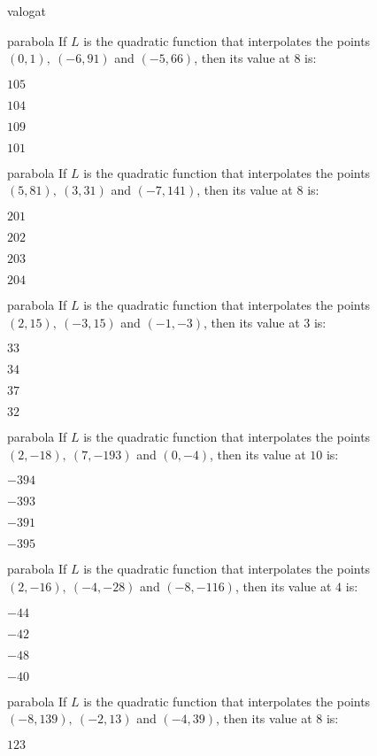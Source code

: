 \documentclass[12pt]{article}
\begin{document}
\begin{quiz}{valogat}
\begin{multi}{parabola}
If $L$ is the quadratic function that interpolates the points
$(0,1),\ (-6,91)$ and $(-5,66)$, then its value at $8$ is:
\item* $ 105 $
\item  $ 104 $
\item  $ 109 $
\item  $ 101 $
\end{multi}
\begin{multi}{parabola}
If $L$ is the quadratic function that interpolates the points
$(5,81),\ (3,31)$ and $(-7,141)$, then its value at $8$ is:
\item* $ 201 $
\item  $ 202 $
\item  $ 203 $
\item  $ 204 $
\end{multi}
\begin{multi}{parabola}
If $L$ is the quadratic function that interpolates the points
$(2,15),\ (-3,15)$ and $(-1,-3)$, then its value at $3$ is:
\item* $ 33 $
\item  $ 34 $
\item  $ 37 $
\item  $ 32 $
\end{multi}
\begin{multi}{parabola}
If $L$ is the quadratic function that interpolates the points
$(2,-18),\ (7,-193)$ and $(0,-4)$, then its value at $10$ is:
\item* $ -394 $
\item  $ -393 $
\item  $ -391 $
\item  $ -395 $
\end{multi}
\begin{multi}{parabola}
If $L$ is the quadratic function that interpolates the points
$(2,-16),\ (-4,-28)$ and $(-8,-116)$, then its value at $4$ is:
\item* $ -44 $
\item  $ -42 $
\item  $ -48 $
\item  $ -40 $
\end{multi}
\begin{multi}{parabola}
If $L$ is the quadratic function that interpolates the points
$(-8,139),\ (-2,13)$ and $(-4,39)$, then its value at $8$ is:
\item* $ 123 $

\end{multi}
\end{quiz}
\end{document}
